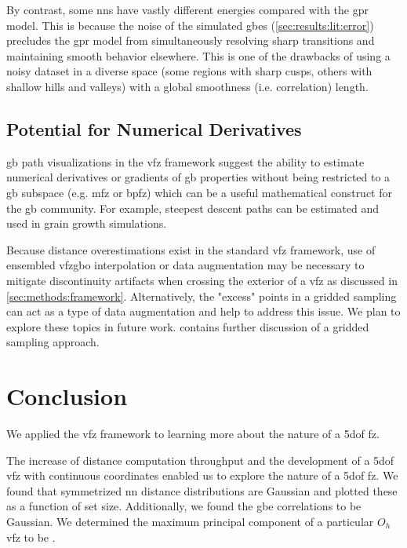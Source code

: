 \documentclass[final,twocolumn,12pt]{elsarticle}
\begin{document}
     By contrast, some \glspl{nn} have vastly different energies compared with the \gls{gpr} model. This is because the noise of the simulated \glspl{gbe} (\cref{sec:results:lit:error}) precludes the \gls{gpr} model from simultaneously resolving sharp transitions and maintaining smooth behavior elsewhere. This is one of the drawbacks of using a noisy dataset in a diverse space (some regions with sharp cusps, others with shallow hills and valleys) with a global smoothness (i.e. correlation) length.
	
	\subsection{Potential for Numerical Derivatives}
	\label{sec:results:deriv}
	
	 \Gls{gb} path visualizations in the \gls{vfz} framework suggest the ability to estimate numerical derivatives or gradients of \gls{gb} properties without being restricted to a \gls{gb} subspace (e.g. \gls{mfz} or \gls{bpfz}) which can be a useful mathematical construct for the \gls{gb} community. For example, steepest descent paths can be estimated and used in grain growth simulations.
	
	Because distance overestimations exist in the standard \gls{vfz} framework, use of ensembled \gls{vfzgbo} interpolation or data augmentation may be necessary to mitigate discontinuity artifacts when crossing the exterior of a \gls{vfz} as discussed in \cref{sec:methods:framework}. Alternatively, the "excess" points in a gridded sampling can act as a type of data augmentation and help to address this issue. We plan to explore these topics in future work.  contains further discussion of a gridded sampling approach.
	 
	\section{Conclusion} \label{sec:conclusion}
	We applied the \gls{vfz} framework to learning more about the nature of a \gls{5dof} \gls{fz}.

	The increase of distance computation throughput and the development of a \gls{5dof} \gls{vfz} with continuous coordinates enabled us to explore the nature of a \gls{5dof} \gls{fz}. We found that symmetrized \gls{nn} distance distributions are Gaussian and plotted these as a function of set size. Additionally, we found the \gls{gbe} correlations to be Gaussian. We determined the maximum principal component of a particular $O_h$ \gls{vfz} to be \dimOne{}.
	
\end{document}
